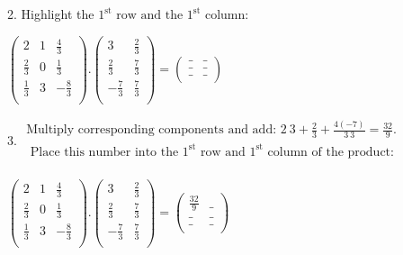 \documentclass{article}
\begin{document}
2. Highlight the $1^{\text{st}}\text{ row and the }1^{\text{st}}$ column:

$\left(
        \begin{array}{ccc}
2           & 1 & \frac{4}{3}  \\
                \frac{2}{3} & 0 & \frac{1}{3}  \\
                \frac{1}{3} & 3 & -\frac{8}{3} \\
            \end{array}
        \right).\left(
        \begin{array}{cc}
3            & \frac{2}{3} \\
                \frac{2}{3}  & \frac{7}{3} \\
                -\frac{7}{3} & \frac{7}{3} \\
            \end{array}
        \right)=\left(
        \begin{array}{cc}
\_ & \_ \\
                \_ & \_ \\
                \_ & \_ \\
            \end{array}
        \right)$

3. $\begin{array}{l}
\text{Multiply corresponding components and add: }2\ 3+\frac{2}{3}+\frac{4 (-7)}{3\ 3}=\frac{32}{9}.                                   \\
\text{            Place this number into the }1^{\text{st}}\text{ row and }1^{\text{st}}\text{ column of the product}: \\
        \end{array}$

$\left(
        \begin{array}{ccc}
2           & 1 & \frac{4}{3}  \\
                \frac{2}{3} & 0 & \frac{1}{3}  \\
                \frac{1}{3} & 3 & -\frac{8}{3} \\
            \end{array}
        \right).\left(
        \begin{array}{cc}
3            & \frac{2}{3} \\
                \frac{2}{3}  & \frac{7}{3} \\
                -\frac{7}{3} & \frac{7}{3} \\
            \end{array}
        \right)=\left(
        \begin{array}{cc}
\frac{32}{9} & \_ \\
                \_                    & \_ \\
                \_                    & \_ \\
            \end{array}
        \right)$
\end{document}
